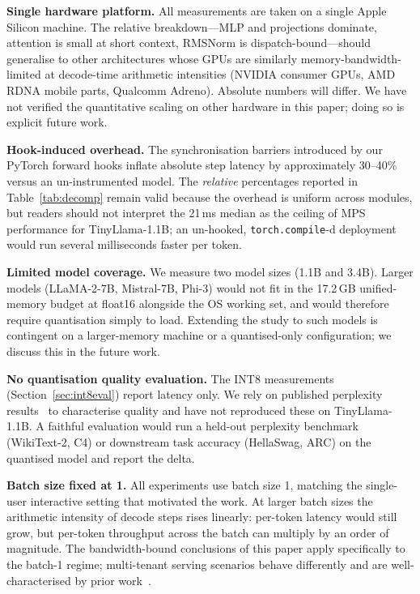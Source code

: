 \documentclass[conference]{IEEEtran}
\begin{document}
\textbf{Single hardware platform.} All measurements are taken on a
single Apple Silicon machine. The relative breakdown---MLP and
projections dominate, attention is small at short context, RMSNorm
is dispatch-bound---should generalise to other architectures whose
GPUs are similarly memory-bandwidth-limited at decode-time arithmetic
intensities (NVIDIA consumer GPUs, AMD RDNA mobile parts, Qualcomm
Adreno). Absolute numbers will differ. We have not verified the
quantitative scaling on other hardware in this paper; doing so is
explicit future work.

\textbf{Hook-induced overhead.} The synchronisation barriers
introduced by our PyTorch forward hooks inflate absolute step latency
by approximately 30--40\% versus an un-instrumented model. The
\emph{relative} percentages reported in Table~\ref{tab:decomp} remain
valid because the overhead is uniform across modules, but readers
should not interpret the 21\,ms median as the ceiling of MPS
performance for TinyLlama-1.1B; an un-hooked, \texttt{torch.compile}-d
deployment would run several milliseconds faster per token.

\textbf{Limited model coverage.} We measure two model sizes (1.1B and
3.4B). Larger models (LLaMA-2-7B, Mistral-7B, Phi-3) would not fit in
the 17.2\,GB unified-memory budget at float16 alongside the OS
working set, and would therefore require quantisation simply to load.
Extending the study to such models is contingent on a larger-memory
machine or a quantised-only configuration; we discuss this in the
future work.

\textbf{No quantisation quality evaluation.} The INT8 measurements
(Section~\ref{sec:int8eval}) report latency only. We rely on
published perplexity results~\cite{dettmers2022, frantar2022} to
characterise quality and have not reproduced these on TinyLlama-1.1B.
A faithful evaluation would run a held-out perplexity benchmark
(WikiText-2, C4) or downstream task accuracy (HellaSwag, ARC) on the
quantised model and report the delta.

\textbf{Batch size fixed at 1.} All experiments use batch size 1,
matching the single-user interactive setting that motivated the work.
At larger batch sizes the arithmetic intensity of decode steps rises
linearly: per-token latency would still grow, but per-token throughput
across the batch can multiply by an order of magnitude. The
bandwidth-bound conclusions of this paper apply specifically to the
batch-1 regime; multi-tenant serving scenarios behave differently and
are well-characterised by prior work~\cite{kwon2023, sheng2023}.
\end{document}

